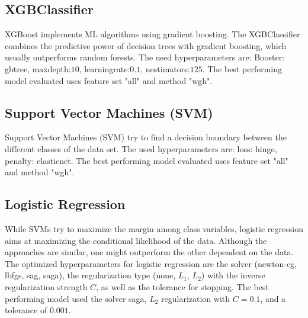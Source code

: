\documentclass[10pt]{article}
\begin{document}
	\subsection{XGBClassifier} %
	XGBoost \cite{Chen:2016:XST:2939672.2939785} implements ML algorithms using gradient boosting. The XGBClassifier combines the predictive power of decision trees with gradient boosting, which usually outperforms random forests. The used hyperparameters are: Booster: gbtree, max\textunderscore depth:$10$, learning\textunderscore rate:$0.1$, n\textunderscore estimators:$125$. The best performing model evaluated uses feature set "all" and method "wgh".
	
	\subsection{Support Vector Machines (SVM)} %
	Support Vector Machines (SVM) \cite{cortes1995support} try to find a decision boundary between the different classes of the data set. The used hyperparameters are: loss: hinge, penalty: elasticnet. The best performing model evaluated uses feature set "all" and method "wgh".
	
	\subsection{Logistic Regression} %
	While SVMs try to maximize the margin among class variables, logistic regression aims at maximizing the conditional likelihood of the data. Although the approaches are similar, one might outperform the other dependent on the data.
	The optimized hyperparameters for logistic regression are the solver (newton-cg, lbfgs, sag, saga), the regularization type (none, $L_1$, $L_2$) with the inverse regularization strength $C$, as well as the tolerance for stopping. The best performing model used the solver saga, $L_2$ regularization with $C=0.1$, and a tolerance of $0.001$.
	
\end{document}
